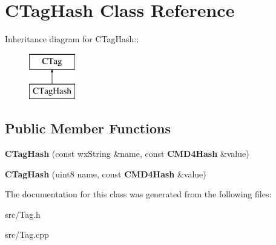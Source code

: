\section{CTagHash Class Reference}
\label{classCTagHash}
Inheritance diagram for CTagHash::\begin{figure}[H]
\begin{center}
\leavevmode
\includegraphics[height=2cm]{classCTagHash}
\end{center}
\end{figure}
\subsection*{Public Member Functions}
\begin{DoxyCompactItemize}
\item 
{\bfseries CTagHash} (const wxString \&name, const {\bf CMD4Hash} \&value)\label{classCTagHash_a76332e43294a83b801b6527e1deaf6e6}

\item 
{\bfseries CTagHash} (uint8 name, const {\bf CMD4Hash} \&value)\label{classCTagHash_a2c98dcfa483e68ba3cb6ec918d2e448c}

\end{DoxyCompactItemize}


The documentation for this class was generated from the following files:\begin{DoxyCompactItemize}
\item 
src/Tag.h\item 
src/Tag.cpp\end{DoxyCompactItemize}
